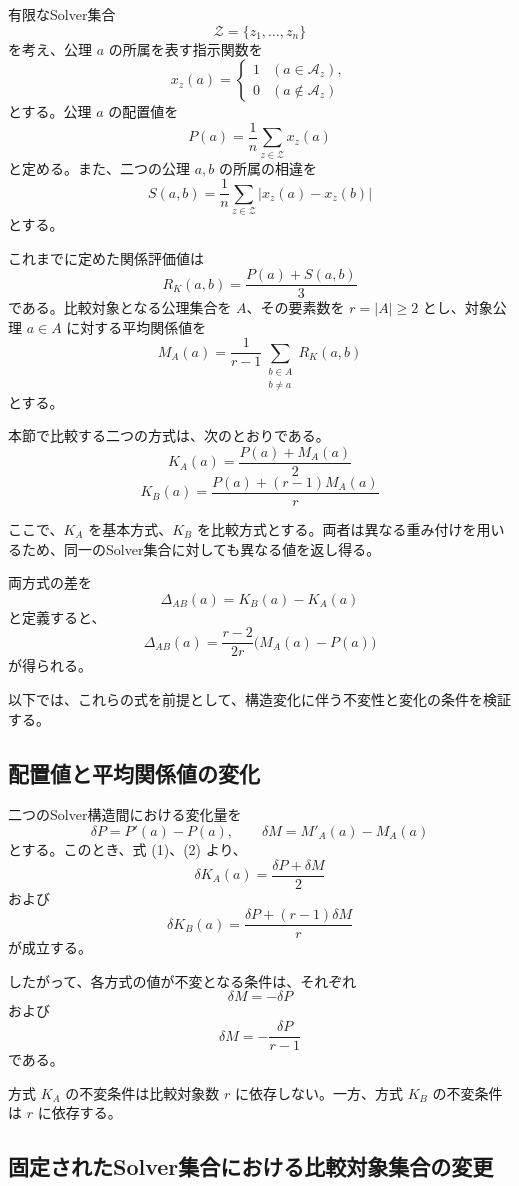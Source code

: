 \documentclass[a4paper,11pt]{ltjsarticle}
\begin{document}
有限なSolver集合
\[
\mathcal{Z}=\{z_1,\ldots,z_n\}
\]
を考え、公理 $a$ の所属を表す指示関数を
\[
x_z(a)=
\begin{cases}
1 & (a\in\mathcal{A}_z),\\
0 & (a\notin\mathcal{A}_z)
\end{cases}
\]
とする。公理 $a$ の配置値を
\[
P(a)=\frac{1}{n}\sum_{z\in\mathcal{Z}}x_z(a)
\]
と定める。また、二つの公理 $a,b$ の所属の相違を
\[
S(a,b)=\frac{1}{n}\sum_{z\in\mathcal{Z}}
\lvert x_z(a)-x_z(b)\rvert
\]
とする。

これまでに定めた関係評価値は
\[
R_K(a,b)=\frac{P(a)+S(a,b)}{3}
\]
である。比較対象となる公理集合を $A$、その要素数を
$r=|A|\geq 2$ とし、対象公理 $a\in A$ に対する平均関係値を
\[
M_A(a)=
\frac{1}{r-1}
\sum_{\substack{b\in A\\b\ne a}}R_K(a,b)
\]
とする。

本節で比較する二つの方式は、次のとおりである。
\[
\boxed{
K_A(a)=\frac{P(a)+M_A(a)}{2}
}
\tag{1}
\]
\[
\boxed{
K_B(a)=
\frac{P(a)+(r-1)M_A(a)}{r}
}
\tag{2}
\]

ここで、$K_A$ を基本方式、$K_B$ を比較方式とする。両者は異なる重み付けを用いるため、同一のSolver集合に対しても異なる値を返し得る。

両方式の差を
\[
\Delta_{AB}(a)=K_B(a)-K_A(a)
\]
と定義すると、
\[
\boxed{
\Delta_{AB}(a)=
\frac{r-2}{2r}\bigl(M_A(a)-P(a)\bigr)
}
\tag{3}
\]
が得られる。

以下では、これらの式を前提として、構造変化に伴う不変性と変化の条件を検証する。

\subsection{配置値と平均関係値の変化}

二つのSolver構造間における変化量を
\[
\delta P=P'(a)-P(a),\qquad
\delta M=M'_A(a)-M_A(a)
\]
とする。このとき、式 (1)、(2) より、
\[
\boxed{
\delta K_A(a)=\frac{\delta P+\delta M}{2}
}
\tag{4}
\]
および
\[
\boxed{
\delta K_B(a)=
\frac{\delta P+(r-1)\delta M}{r}
}
\tag{5}
\]
が成立する。

したがって、各方式の値が不変となる条件は、それぞれ
\[
\boxed{\delta M=-\delta P}
\tag{6}
\]
および
\[
\boxed{
\delta M=-\frac{\delta P}{r-1}
}
\tag{7}
\]
である。

方式 $K_A$ の不変条件は比較対象数 $r$ に依存しない。一方、方式 $K_B$ の不変条件は $r$ に依存する。

\subsection{固定されたSolver集合における比較対象集合の変更}
\end{document}
